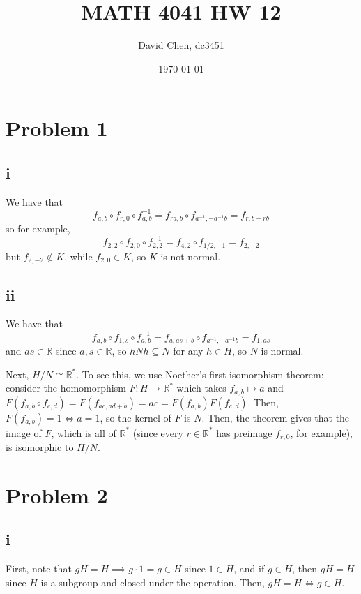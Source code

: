 \documentclass[12pt,letterpaper]{article}
\title{MATH 4041 HW 12}
\author{David Chen, dc3451}
\date{\today}
\theoremstyle{definition}
\newcommand{\R}{\mathbb{R}}
\begin{document}
\maketitle

\section*{Problem 1}

\subsection*{i}

We have that
\[
  f_{a,b} \circ f_{r,0} \circ f^{-1}_{a,b} = f_{ra,b} \circ f_{a^{-1},-a^{-1}b} = f_{r, b-rb}
\]
so for example,
\[
  f_{2,2} \circ f_{2,0} \circ f^{-1}_{2,2} = f_{4,2} \circ f_{1/2,-1} = f_{2,-2}
\]
but $f_{2,-2} \notin K$, while $f_{2,0} \in K$, so $K$ is not normal.

\subsection*{ii}

We have that
\[
  f_{a,b} \circ f_{1,s} \circ f^{-1}_{a,b} = f_{a,as + b} \circ f_{a^{-1},-a^{-1}b} = f_{1, as}
\]
and $as \in \R$ since $a, s \in \R$, so $hNh \subseteq N$ for any $h \in H$, so $N$ is normal.

Next, $H/N \cong \R^{*}$. To see this, we use Noether's first isomorphism theorem: consider the homomorphism $F: H \rightarrow \R^{*}$ which takes $f_{a,b} \mapsto a$ and $F(f_{a,b} \circ f_{c,d}) = F(f_{ac,ad + b}) = ac = F(f_{a,b})F(f_{c,d})$. Then, $F(f_{a,b}) = 1 \iff a = 1$, so the kernel of $F$ is $N$. Then, the theorem gives that the image of $F$, which is all of $\R^{*}$ (since every $r \in \R^{*}$ has preimage $f_{r,0}$, for example), is isomorphic to $H/N$.

\section*{Problem 2}

\subsection*{i}

First, note that $gH = H \implies g \cdot 1 = g \in H$ since $1 \in H$, and if $g \in H$, then $gH = H$ since $H$ is a subgroup and closed under the operation. Then, $gH = H \iff g \in H$.
\end{document}
